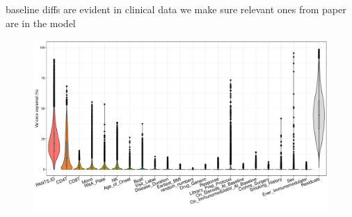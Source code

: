 \begin{outline}
baseline diffs are evident in clinical data
we make sure relevant ones from paper are in the model


\begin{figure}
    \centering
    \includegraphics[width=1.0\textwidth,page=1]{mainmatter/figures/chapter_04/dream.plotVarPart.pdf}
    \caption{}
    \label{fig:multipants_varPart}
\end{figure}


\end{outline}

